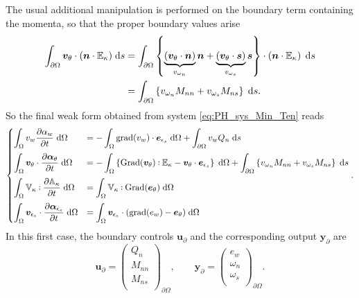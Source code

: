 \documentclass[preprint,12pt]{elsarticle}
\def\onedot{$\mathsurround0pt\ldotp$}
\def\cddot{%
	\mathbin{\vcenter{\baselineskip.67ex
			\hbox{\onedot}\hbox{\onedot}}%
}}
\begin{document}
The usual additional manipulation is performed on the boundary term containing the momenta, so that the proper boundary values arise
\begin{equation}
\label{eq:line1_ipbc_ten_min}
\begin{aligned}
\int_{\partial \Omega} \bm{v}_{\theta} \cdot (\bm{n} \cdot \mathbb{E}_{\kappa})  \d{s} &= \int_{\partial \Omega} \left\{\underbrace{(\bm{v}_{\theta} \cdot \bm{n})}_{v_{\omega_n}} \bm{n} + \underbrace{(\bm{v}_{\theta} \cdot \bm{s})}_{v_{\omega_s}} \bm{s} \right\} \cdot (\bm{n} \cdot \mathbb{E}_{\kappa}) \,  \d{s} \\
&= \int_{\partial \Omega} \left\{ v_{\omega_n} M_{nn} + v_{\omega_s} M_{ns} \right\}  \d{s}.
\end{aligned}
\end{equation}
So the final weak form obtained from system \eqref{eq:PH_sys_Min_Ten} reads
\begin{equation}
\label{eq:WF_Min_Dyn}
\begin{cases}
\displaystyle\int_{\Omega} v_w \diffp{\alpha_w}{t}  \d\Omega  &= - \displaystyle\int_{\Omega} \mathrm{grad}(v_w)  \cdot \bm{e}_{\epsilon_s}  \d\Omega +  \displaystyle\int_{\partial \Omega} v_w Q_n  \d{s} \vspace{2mm}\\
\displaystyle\int_{\Omega} \bm{v}_{\theta} \cdot \diffp{\bm\alpha_{\theta}}{t}   \d\Omega &=  -\displaystyle\int_{\Omega} \left\{ \mathrm{Grad}(\bm{v}_{\theta}) \cddot \mathbb{E}_{\kappa} - \bm{v}_{\theta} \cdot \bm{e}_{\epsilon_s}\right\}  \d\Omega + \displaystyle\int_{\partial \Omega} \left\{ v_{\omega_n} M_{nn} + v_{\omega_s} M_{ns} \right\}  \d{s} \vspace{2mm} \\
\displaystyle\int_{\Omega} \mathbb{V}_{\kappa} \cddot \diffp{\mathbb{A}_{\kappa}}{t}   \d\Omega &= \displaystyle\int_{\Omega} \mathbb{V}_{\kappa} \cddot \mathrm{Grad}(\bm{e}_\theta)  \d\Omega  \vspace{2mm} \\
\displaystyle\int_{\Omega} \bm{v}_{\epsilon_s} \cdot \diffp{\bm\alpha_{\epsilon_s}}{t}   \d\Omega &= \displaystyle\int_{\Omega} \bm{v}_{\epsilon_s} \cdot (\mathrm{grad}({e}_{w}) - \bm{e}_{\theta})  \d\Omega
\end{cases}.
\end{equation}
In this first case,  the boundary controls $\bm{u}_\partial$ and the corresponding output $\bm{y}_\partial$ are 
\[\bm{u}_\partial = 
\begin{pmatrix}
{Q}_n \\
M_{nn} \\
M_{ns} \\
\end{pmatrix}_{\partial \Omega}, \qquad
\bm{y}_\partial = 
\begin{pmatrix}
e_w \\
\omega_n \\
\omega_s \\
\end{pmatrix}_{\partial \Omega}.
\]
\end{document}
